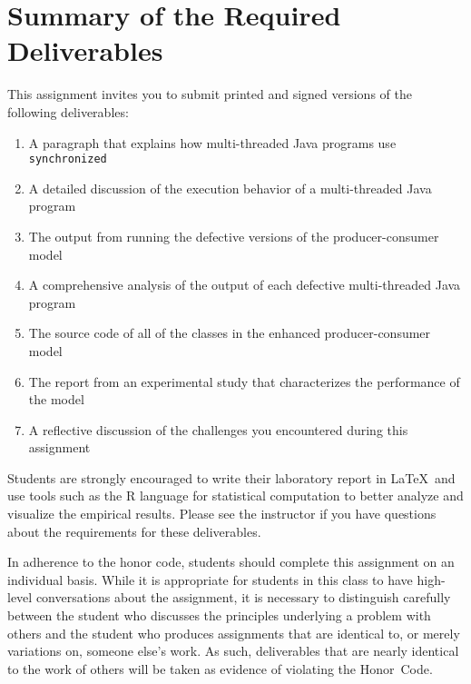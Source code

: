 \section*{Summary of the Required Deliverables}

This assignment invites you to submit printed and signed versions of the following deliverables: 

  \begin{enumerate}
    \item A paragraph that explains how multi-threaded Java programs use {\tt synchronized} 
    \item A detailed discussion of the execution behavior of a multi-threaded Java program
    \item The output from running the defective versions of the producer-consumer model
    \item A comprehensive analysis of the output of each defective multi-threaded Java program
    \item The source code of all of the classes in the enhanced producer-consumer model 
    \item The report from an experimental study that characterizes the performance of the model 
    \item A reflective discussion of the challenges you encountered during this assignment 
  \end{enumerate}

Students are strongly encouraged to write their laboratory report in \LaTeX~and use tools such as the R language for statistical
computation to better analyze and visualize the empirical results. Please see the instructor if you have questions about the
requirements for these deliverables.

In adherence to the honor code, students should complete this assignment on an individual basis. While it is appropriate for
students in this class to have high-level conversations about the assignment, it is necessary to distinguish carefully between the
student who discusses the principles underlying a problem with others and the student who produces assignments that are identical
to, or merely variations on, someone else's work.  As such, deliverables that are nearly identical to the work of others will be
taken as evidence of violating the \mbox{Honor Code}.  

  
